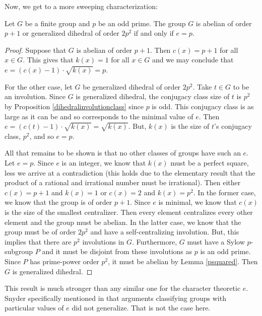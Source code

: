 \documentclass[main.tex]{subfiles}
\begin{document}
Now, we get to a more sweeping characterization:

\begin{theorem}\label{eprime}
Let $G$ be a finite group and $p$ be an odd prime. The group $G$ is abelian of order $p+1$ or generalized dihedral of order $2p^2$ if and only if $e = p$.
\end{theorem}

\begin{proof}
Suppose that $G$ is abelian of order $p+1$. Then $c(x) = p+1$ for all $x \in G$. This gives that $k(x) = 1$ for all $x \in G$ and we may conclude that $e = (c(x) - 1) \cdot \sqrt{k(x)} = p$.

For the other case, let $G$ be generalized dihedral of order $2p^2$. Take $t \in G$ to be an involution. Since $G$ is generalized dihedral, the conjugacy class size of $t$ is $p^2$ by Proposition \ref{dihedralinvolutionclass} since $p$ is odd. This conjugacy class is as large as it can be and so corresponds to the minimal value of $e$. Then $e = (c(t) - 1) \cdot \sqrt{k(x)} = \sqrt{k(x)}$. But, $k(x)$ is the size of $t$'s conjugacy class, $p^2$, and so $e = p$.

All that remains to be shown is that no other classes of groups have such an $e$. Let $e = p$. Since $e$ is an integer, we know that $k(x)$ must be a perfect square, less we arrive at a contradiction (this holds due to the elementary result that the product of a rational and irrational number must be irrational). Then either $c(x) = p+1$ and $k(x) = 1$ or $c(x) = 2$ and $k(x) = p^2$. In the former case, we know that the group is of order $p+1$. Since $e$ is minimal, we know that $c(x)$ is the size of the smallest centralizer. Then every element centralizes every other element and the group must be abelian. In the latter case, we know that the group must be of order $2p^2$ and have a self-centralizing involution. But, this implies that there are $p^2$ involutions in $G$. Furthermore, $G$ must have a Sylow $p$-subgroup $P$ and it must be disjoint from these involutions as $p$ is an odd prime. Since $P$ has prime-power order $p^2$, it must be abelian by Lemma \ref{psquared}. Then $G$ is generalized dihedral.
\end{proof}

This result is much stronger than any similar one for the character theoretic $e$. Snyder specifically mentioned in \cite{snyderarticle} that arguments classifying groups with particular values of $e$ did not generalize. That is not the case here.
\end{document}
